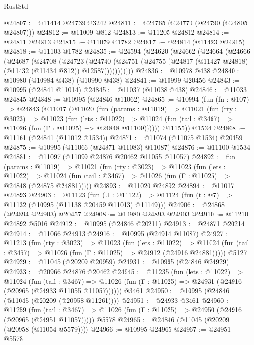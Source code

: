 \begin{lexlean}{RustStd}
\begin{coremodule}
@24807 := @11414 @24739 @3242
@24811 := @24765 (@24770 (@24790 (@24805 @24807)))
@24812 := @11009 @812
@24813 := @11205 @24812
@24814 := @24811 @24813
@24815 := @11079 @1782
@24817 := @24814 (@11423 @24815)
@24818 := @11103 @1782
@24835 := @24594
    (@24620
      (@24662
        (@24664
          (@24666
            (@24687
              (@24708
                (@24723
                  (@24740
                    (@24751 (@24755 (@24817 (@11427 @24818) (@11432 (@11434 @812)) @12587)))))))))))
@24836 := @10978 @438
@24840 := @10980 (@10984 @438) (@10990 @438)
@24841 := @10999 @20456
@24843 := @10995 (@24841 @11014)
@24845 := @11037 (@11038 @438)
@24846 := @11033 @24845
@24848 := @10995 (@24846 @11062)
@24865 := @10994
    (fun (fn : @107) =>
    @24843
      (@11017
        (@11020
          (fun (params : @11019) =>
          @11021
            (fun (rty : @3023) =>
            @11023
              (fun (lets : @11022) =>
              @11024 (fun (tail : @3467) => @11026 (fun (Γ : @11025) => @24848 @11109))))))
        @11155))
    @1534
@24868 := @11161 (@24841 (@11012 @1534))
@24871 := @11074 (@11075 @1534) @20459
@24875 := @10995 (@11066 (@24871 @11083) @11087)
@24876 := @11100 @1534
@24881 := @11097 (@11099 @24876 @20462 @11055 @11057)
@24892 := fun (params : @11019) =>
  @11021
    (fun (rty : @3023) =>
    @11023
      (fun (lets : @11022) =>
      @11024 (fun (tail : @3467) => @11026 (fun (Γ : @11025) => @24848 (@24875 @24881)))))
@24893 := @11020 @24892
@24894 := @11017 @24893
@24903 := @11123
    (fun (U : @11122) => @11124 (fun (t : @7) => @11132 (@10995 (@11138 @20459 @11013) @11149)))
@24906 := @24868 (@24894 @24903) @20457
@24908 := @10980 @24893 @24903
@24910 := @11210 @24892 @5016
@24912 := @10995 (@24846 @20211)
@24913 := @24871 @20214
@24914 := @11066 @24913
@24916 := @10995 (@24914 @11087)
@24927 := @11213
    (fun (rty : @3023) =>
    @11023
      (fun (lets : @11022) =>
      @11024 (fun (tail : @3467) => @11026 (fun (Γ : @11025) => @24912 (@24916 @24881)))))
    @5127
@24929 := @11045 (@20209 @20959)
@24931 := @10995 (@24846 @24929)
@24933 := @20966 @24876 @20462
@24945 := @11235
    (fun (lets : @11022) =>
    @11024
      (fun (tail : @3467) =>
      @11026 (fun (Γ : @11025) => @24931 (@24916 (@20965 (@24933 @11055 @11057))))))
    @3461
@24950 := @10995 (@24846 (@11045 (@20209 (@20958 @11261))))
@24951 := @24933 @3461
@24960 := @11259
    (fun (tail : @3467) => @11026 (fun (Γ : @11025) => @24950 (@24916 (@20965 (@24951 @11057)))))
    @5578
@24965 := @24846 (@11045 (@20209 (@20958 (@11054 @5579))))
@24966 := @10995 @24965
@24967 := @24951 @5578

\end{coremodule}
\end{lexlean}
